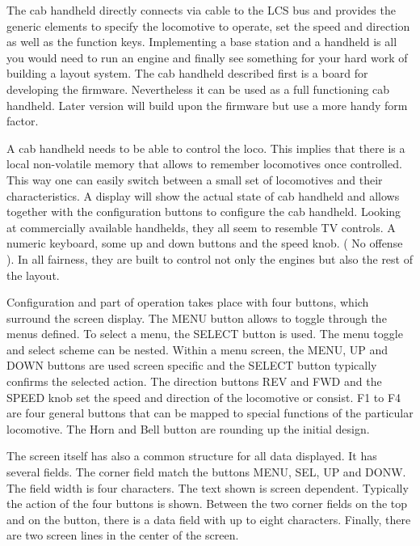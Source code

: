 
 The cab handheld directly connects via cable to the LCS bus and provides the generic elements to specify the locomotive to operate, set the speed and direction as well as the function keys. Implementing a base station and a handheld is all you would need to run an engine and finally see something for your hard work of building a layout system. The cab handheld described first is a board for developing the firmware. Nevertheless it can be used as a full functioning cab handheld. Later version will build upon the firmware but use a more handy form factor.


A cab handheld needs to be able to control the loco. This implies that there is a local non-volatile memory that allows to remember locomotives once controlled. This way one can easily switch between a small set of locomotives and their characteristics. A display will show the actual state of cab handheld and allows together with the configuration buttons to configure the cab handheld. Looking at commercially available handhelds, they all seem to resemble TV controls. A numeric keyboard, some up and down buttons and the speed knob. ( No offense ). In all fairness, they are built to control not only the engines but also the rest of the layout.

Configuration and part of operation takes place with four buttons, which surround the screen display. The MENU button allows to toggle through the menus defined. To select a menu, the SELECT button is used. The menu toggle and select scheme can be nested. Within a menu screen, the MENU, UP and DOWN buttons are used screen specific and the SELECT button typically confirms the selected action. The direction buttons REV and FWD and the SPEED knob set the speed and direction of the locomotive or consist. F1 to F4 are four general buttons that can be mapped to special functions of the particular locomotive. The Horn and Bell button are rounding up the initial design.

The screen itself has also a common structure for all data displayed. It has several fields. The corner field match the buttons MENU, SEL, UP and DONW. The field width is four characters. The text shown is screen dependent. Typically the action of the four buttons is shown. Between the two corner fields on the top and on the button, there is a data field with up to eight characters. Finally, there are two screen lines in the center of the screen. 


